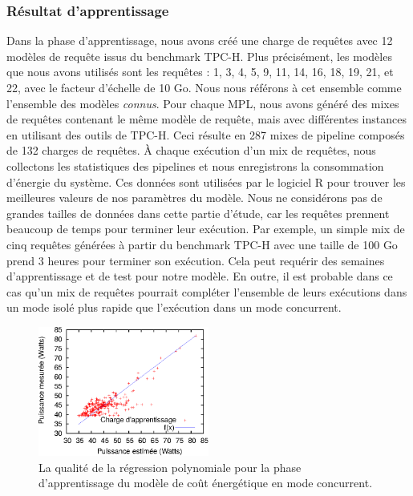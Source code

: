 \subsubsection{Résultat d'apprentissage}
Dans la phase d'apprentissage, nous avons créé une charge de requêtes avec 12 modèles de requête issus du benchmark TPC-H. Plus précisément, les modèles que nous avons utilisés sont les requêtes : 1, 3, 4, 5, 9, 11, 14, 16, 18, 19, 21, et 22, avec le facteur d'échelle de 10 Go. Nous nous référons à cet ensemble comme l'ensemble des modèles \textit{connus}.
Pour chaque MPL, nous avons généré des mixes de requêtes contenant le même modèle de requête, mais avec différentes instances en utilisant des outils de TPC-H. Ceci résulte en 287 mixes de pipeline composés de 132 charges de requêtes.
À chaque exécution d'un mix de requêtes, nous collectons les statistiques des pipelines et nous enregistrons la consommation d'énergie du système. Ces données sont utilisées par le logiciel R pour trouver les meilleures valeurs de nos paramètres du modèle.
Nous ne considérons pas de grandes tailles de données dans cette partie d'étude, car les requêtes prennent beaucoup de temps pour terminer leur exécution. Par exemple, un simple mix de cinq requêtes générées à partir du benchmark TPC-H avec une taille de 100 Go prend 3 heures pour terminer son exécution. Cela peut requérir des semaines d'apprentissage et de test pour notre modèle. En outre,  il est probable dans ce cas qu'un mix de requêtes pourrait compléter l'ensemble de leurs exécutions dans un mode isolé plus rapide que l'exécution dans un mode concurrent.

\begin{figure}
  \centering
  \includegraphics[width=0.5\textwidth]{chapitre4/chap4Fig/tpch-reg-poly-concurrent.eps}
  \caption{La qualité de la régression polynomiale pour la phase d'apprentissage du modèle de coût énergétique en mode concurrent.}\label{fig:tpch-reg-concurrent}
\end{figure}

